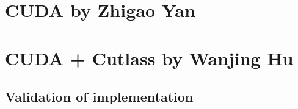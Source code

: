 \documentclass[11pt]{article}
\begin{document}


 \begin{comment}
\begin{algorithm}[htbp]
  \caption{Standard Attention}
  \label{alg:standard_attention}
  \begin{algorithmic}[1]
    \STATE Load $Q$ and $K$ by blocks from HBM.
    \STATE Compute $S = (1/\sqrt{d})QK^T$ (GEMM-I).
    \STATE Write $S$ to HBM.
    \STATE Read $S$ from HBM.
    \STATE Compute $S = S - \text{rowmax}(S)$.
    \STATE Compute $P = \text{softmax}(S)$.
    \STATE Write $P$ to HBM.
    \STATE Load $P$ and $V$ by blocks from HBM.
    \STATE Compute $O = PV$ (GEMM-II).
    \STATE Write $O$ to HBM.
  \end{algorithmic}
\end{algorithm}
\end{comment}


\section{CUDA by Zhigao Yan}

\section{CUDA + Cutlass by Wanjing Hu}

\subsection{Validation of implementation}
\end{document}
